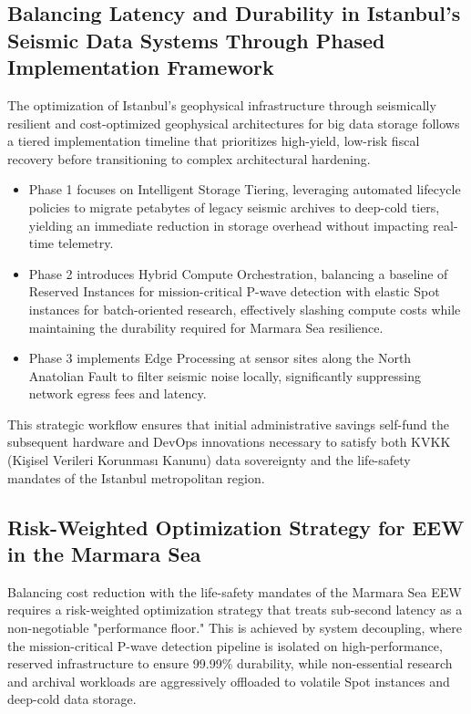 \documentclass[data,article,submit,pdftex,moreauthors]{Definitions/mdpi}
\begin{document}
\subsection{Balancing Latency and Durability in Istanbul’s Seismic Data Systems Through Phased Implementation Framework}

The optimization of Istanbul’s geophysical infrastructure through seismically resilient and cost-optimized geophysical architectures for big data storage follows a tiered implementation timeline that prioritizes high-yield, low-risk fiscal recovery before transitioning to complex architectural hardening. 

\begin{itemize}
\item Phase 1 focuses on Intelligent Storage Tiering, leveraging automated lifecycle policies to migrate petabytes of legacy seismic archives to deep-cold tiers, yielding an immediate reduction in storage overhead without impacting real-time telemetry. 
\item Phase 2 introduces Hybrid Compute Orchestration, balancing a baseline of Reserved Instances for mission-critical P-wave detection with elastic Spot instances for batch-oriented research, effectively slashing compute costs while maintaining the durability required for Marmara Sea resilience.  
\item Phase 3 implements Edge Processing at sensor sites along the North Anatolian Fault to filter seismic noise locally, significantly suppressing network egress fees and latency. 
\end{itemize}

This strategic workflow ensures that initial administrative savings self-fund the subsequent hardware and DevOps innovations necessary to satisfy both KVKK (Kişisel Verileri Korunması Kanunu) data sovereignty and the life-safety mandates of the Istanbul metropolitan region.

\subsection{Risk-Weighted Optimization Strategy for EEW in the Marmara Sea}
Balancing cost reduction with the life-safety mandates of the Marmara Sea EEW requires a risk-weighted optimization strategy that treats sub-second latency as a non-negotiable "performance floor." This is achieved by system decoupling, where the mission-critical P-wave detection pipeline is isolated on high-performance, reserved infrastructure to ensure 99.99\% durability, while non-essential research and archival workloads are aggressively offloaded to volatile Spot instances and deep-cold data storage. 
\end{document}
